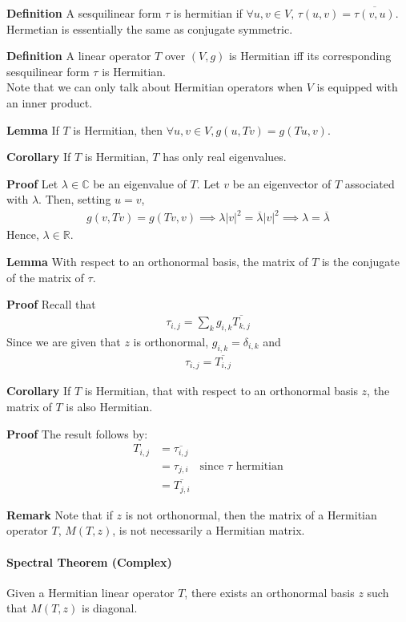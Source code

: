\documentclass{article}
\begin{document}
\textbf{Definition} A sesquilinear form $\tau$ is hermitian if $\forall u,v\in V,\, \tau(u,v)=\overline{\tau(v,u)}$.\\
Hermetian is essentially the same as conjugate symmetric.

\textbf{Definition} A linear operator $T$ over $(V,g)$ is Hermitian iff its corresponding sesquilinear form $\tau$ is Hermitian.\\
Note that we can only talk about Hermitian operators when $V$ is equipped with an inner product.


\textbf{Lemma} If $T$ is Hermitian, then $\forall u,v \in V, g(u,Tv)=g(Tu,v)$.

\textbf{Corollary} If $T$ is Hermitian, $T$ has only real eigenvalues.

\textbf{Proof} Let $\lambda \in \mathbb{C}$ be an eigenvalue of $T$. Let $v$ be an eigenvector of $T$ associated with $\lambda$. Then, setting $u=v$,
\begin{align*}
	g(v,Tv) = g(Tv,v) \implies \lambda |v|^2=\overline{\lambda} |v|^2 \implies \lambda=\overline{\lambda}
\end{align*}
Hence, $\lambda \in \mathbb{R}$.

\textbf{Lemma} With respect to an orthonormal basis, the matrix of $T$ is the conjugate of the matrix of $\tau$.

\textbf{Proof} Recall that 
\begin{align*}
	\tau_{i,j} = \sum_k g_{i,k}\overline{T_{k,j}}
\end{align*}
Since we are given that $z$ is orthonormal, $g_{i,k}=\delta_{i,k}$ and 
\begin{align*}
	\tau_{i,j} = \overline{T_{i,j}}
\end{align*}

\textbf{Corollary} If $T$ is Hermitian, that with respect to an orthonormal basis $z$, the matrix of $T$ is also Hermitian.

\textbf{Proof} The result follows by:
\begin{align*}
	T_{i,j} &= \overline{\tau_{i,j}} \\
	&= \tau_{j,i}\quad \text{since }\tau \text{ hermitian}\\
	&= \overline{T_{j,i}}
\end{align*}

\textbf{Remark} Note that if $z$ is not orthonormal, then the matrix of a Hermitian operator $T$, $M(T,z)$, is not necessarily a Hermitian matrix.

\paragraph{Spectral Theorem (Complex)} Given a Hermitian linear operator $T$, there exists an orthonormal basis $z$ such that $M(T,z)$ is diagonal.
\end{document}
